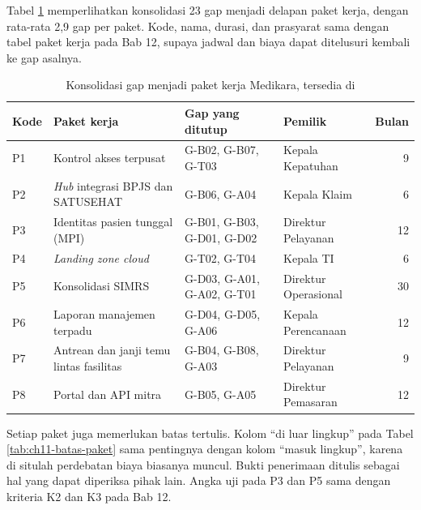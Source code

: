 Tabel \ref{tab:ch11-konsolidasi} memperlihatkan konsolidasi 23 gap menjadi delapan paket kerja,
dengan rata-rata 2,9 gap per paket. Kode, nama, durasi, dan prasyarat sama dengan tabel paket
kerja pada Bab 12, supaya jadwal dan biaya dapat ditelusuri kembali ke gap asalnya.

\begin{table}[!htb]
  \centering
  \caption{Konsolidasi gap menjadi paket kerja Medikara, tersedia di
           }
  \label{tab:ch11-konsolidasi}
  \footnotesize
  \begin{tabularx}{\textwidth}{l>{\raggedright\arraybackslash}X>{\raggedright\arraybackslash}p{3.4cm}>{\raggedright\arraybackslash}p{2.9cm}r}
    \hline
    \textbf{Kode} & \textbf{Paket kerja} & \textbf{Gap yang ditutup} & \textbf{Pemilik} & \textbf{Bulan} \\ \hline
    P1 & Kontrol akses terpusat & G-B02, G-B07, G-T03 & Kepala Kepatuhan & 9 \\ \hline
    P2 & \textit{Hub} integrasi BPJS dan SATUSEHAT & G-B06, G-A04 & Kepala Klaim & 6 \\ \hline
    P3 & Identitas pasien tunggal (MPI) & G-B01, G-B03, G-D01, G-D02 & Direktur Pelayanan & 12 \\ \hline
    P4 & \textit{Landing zone cloud} & G-T02, G-T04 & Kepala TI & 6 \\ \hline
    P5 & Konsolidasi SIMRS & G-D03, G-A01, G-A02, G-T01 & Direktur Operasional & 30 \\ \hline
    P6 & Laporan manajemen terpadu & G-D04, G-D05, G-A06 & Kepala Perencanaan & 12 \\ \hline
    P7 & Antrean dan janji temu lintas fasilitas & G-B04, G-B08, G-A03 & Direktur Pelayanan & 9 \\ \hline
    P8 & Portal dan API mitra & G-B05, G-A05 & Direktur Pemasaran & 12 \\ \hline
  \end{tabularx}
\end{table}

Setiap paket juga memerlukan batas tertulis. Kolom ``di luar lingkup'' pada Tabel
\ref{tab:ch11-batas-paket} sama pentingnya dengan kolom ``masuk lingkup'', karena di situlah
perdebatan biaya biasanya muncul. Bukti penerimaan ditulis sebagai hal yang dapat diperiksa
pihak lain. Angka uji pada P3 dan P5 sama dengan kriteria K2 dan K3 pada Bab 12.

